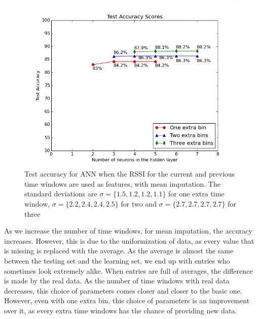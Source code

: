 \begin{figure}[h]
	\begin{center}
		\includegraphics[scale=0.6]{figures/ann_params2.png}
	\end{center}
	
	\caption{Test accuracy for ANN when the RSSI for the current and previous time windows are used as features, with mean imputation. The standard deviations are $\sigma=\lbrace 1.5,1.2,1.2,1.1 \rbrace $ for one extra time window, $\sigma=\lbrace 2.2,2.4,2.4,2.5 \rbrace $ for two and $\sigma=\lbrace 2.7,2.7,2.7,2.7 \rbrace $ for three}
	\label{pic:ann_params1}

\end{figure}

As we increase the number of time windows, for mean imputation, the accuracy increases. However, this is due to the uniformization of data, as every value that is missing is replaced with the average. As the average is almost the same between the testing set and the learning set, we end up with entries who sometimes look extremely alike. When entries are full of averages, the difference is made by the real data. As the number of time windows with real data decreases, this choice of parameters comes closer and closer to the basic one. However, even with one extra bin, this choice of parameters is an improvement over it, as every extra time windows has the chance of providing new data.   

